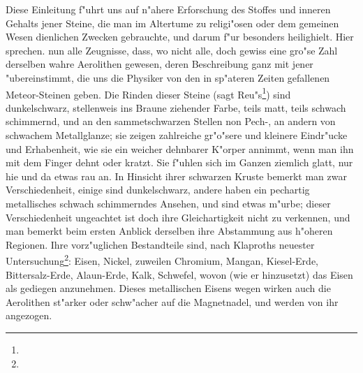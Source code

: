 \documentclass[a4paper, 11pt, oneside, polutonikogreek, german]{article}
\begin{document}
Diese Einleitung f"uhrt uns auf n"ahere Erforschung des Stoffes und inneren Gehalts jener Steine, die man im Altertume zu religi"osen oder dem gemeinen Wesen dienlichen Zwecken gebrauchte, und darum f"ur besonders heilighielt. Hier sprechen. nun alle Zeugnisse, dass, wo nicht alle, doch gewiss eine gro"se Zahl derselben wahre Aerolithen gewesen, deren Beschreibung ganz mit jener "ubereinstimmt, die uns die Physiker von den in sp"ateren Zeiten gefallenen Meteor-Steinen geben. Die Rinden dieser Steine (sagt Reu"s\footnote{}) sind dunkelschwarz, stellenweis ins Braune ziehender Farbe, teils matt, teils schwach schimmernd, und an den sammetschwarzen Stellen non Pech-, an andern von schwachem Metallglanze; sie zeigen zahlreiche gr"o"sere und kleinere Eindr"ucke und Erhabenheit, wie sie ein weicher dehnbarer K"orper annimmt, wenn man ihn mit dem Finger dehnt oder kratzt. Sie f"uhlen sich im Ganzen ziemlich glatt, nur hie und da etwas rau an. In Hinsicht ihrer schwarzen Kruste bemerkt man zwar Verschiedenheit, einige sind dunkelschwarz, andere haben ein pechartig metallisches schwach schimmerndes Ansehen, und sind etwas m"urbe; dieser Verschiedenheit ungeachtet ist doch ihre Gleichartigkeit nicht zu verkennen, und man bemerkt beim ersten Anblick derselben ihre Abstammung aus h"oheren Regionen. Ihre vorz"uglichen Bestandteile sind, nach Klaproths neuester Untersuchung\footnote{}: Eisen, Nickel, zuweilen Chromium, Mangan, Kiesel-Erde, Bittersalz-Erde, Alaun-Erde, Kalk, Schwefel, wovon (wie er hinzusetzt) das Eisen als gediegen anzunehmen. Dieses metallischen Eisens wegen wirken auch die Aerolithen st"arker oder schw"acher auf die Magnetnadel, und werden von ihr angezogen.
\end{document}
